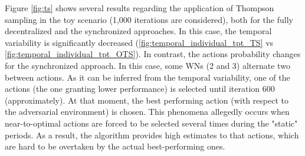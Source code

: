 \documentclass[preprint,12pt]{article}
\begin{document}
Figure \ref{fig:ts} shows several results regarding the application of Thompson sampling in the toy scenario (1,000 iterations are considered), both for the fully decentralized and the synchronized approaches. In this case, the temporal variability is significantly decreased (\ref{fig:temporal_individual_tpt_TS} vs \ref{fig:temporal_individual_tpt_OTS}). In contrast, the actions probability changes for the synchronized approach. In this case, some WNs (2 and 3) alternate two between actions. As it can be inferred from the temporal variability, one of the actions (the one granting lower performance) is selected until iteration 600 (approximately). At that moment, the best performing action (with respect to the adversarial environment) is chosen. This phenomena allegedly occurs when near-to-optimal actions are forced to be selected several times during the "static" periods. As a result, the algorithm provides high estimates to that actions, which are hard to be overtaken by the actual best-performing ones.
\end{document}
